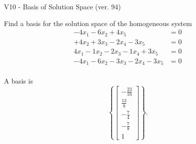 \begin{exercise}
  \begin{exerciseTitle}V10 - Basis of Solution Space (ver. 94)\end{exerciseTitle}
  \begin{exerciseStatement}
    Find a basis for the solution space of the homogeneous system 
\begin{align*}
 -4 x_ 1 -6 x_ 2 + 4 x_ 5 &= 0  \\ 
  + 4 x_ 2 + 3 x_ 3 -2 x_ 4 -3 x_ 5 &= 0  \\ 
  4 x_ 1 -1 x_ 2 -2 x_ 3 -1 x_ 4 + 3 x_ 5 &= 0  \\ 
  -4 x_ 1 -6 x_ 2 -3 x_ 3 -2 x_ 4 -3 x_ 5 &= 0  \\ 
 \end{align*}


 
  \end{exerciseStatement}

  \begin{exerciseAnswer}
   A basis is   
\[\left\{\left[\begin{array}{c}
-\frac{23}{16} \\
\frac{13}{8} \\
-\frac{7}{4} \\
-\frac{7}{8} \\
1
\end{array}\right]\right\}.\]

  


  \end{exerciseAnswer}
\end{exercise}